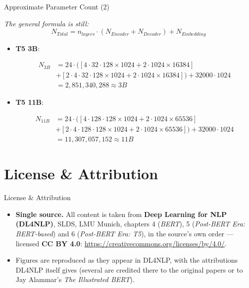 \begin{frame}{Approximate Parameter Count (2)}
\small%

\textit{The general formula is still:} $$N_{Total} = n_{layers}\cdot (N_{Encoder} + N_{Decoder}) + N_{Embedding}$$

\begin{itemize}
    \item \textbf{T5 3B}: 

					\begin{align*}
							N_{3B} &= 24\cdot ([4\cdot 32\cdot 128 \times 1024 + 2\cdot 1024 \times 16384] \\
							&+ [2\cdot 4 \cdot 32\cdot 128 \times 1024 + 2\cdot 1024 \times 16384]) + 32000\cdot 1024 \\
							&= 2,851,340,288 \approx 3B
					\end{align*}

    \item \textbf{T5 11B}:

					\begin{align*}
							N_{11B} &= 24\cdot ([4\cdot 128\cdot 128 \times 1024 + 2\cdot 1024 \times 65536] \\
							&+ [2\cdot 4 \cdot 128\cdot 128 \times 1024 + 2\cdot 1024 \times 65536]) + 32000\cdot 1024 \\
							&= 11,307,057,152 \approx 11B
					\end{align*}

\end{itemize}
    
\end{frame}



\section{License \& Attribution}

\begin{vbframe}{License \& Attribution}
\begin{itemize}
\item \textbf{Single source.} All content is taken from \textbf{Deep Learning for NLP (DL4NLP)}, SLDS, LMU Munich, chapters 4 (\textit{BERT}), 5 (\textit{Post-BERT Era: BERT-based}) and 6 (\textit{Post-BERT Era: T5}), in the source's own order --- licensed \textbf{CC BY 4.0}: \url{https://creativecommons.org/licenses/by/4.0/}.
\item Figures are reproduced as they appear in DL4NLP, with the attributions DL4NLP itself gives (several are credited there to the original papers or to Jay Alammar's \textit{The Illustrated BERT}).
\end{itemize}
\end{vbframe}

\endlecture

